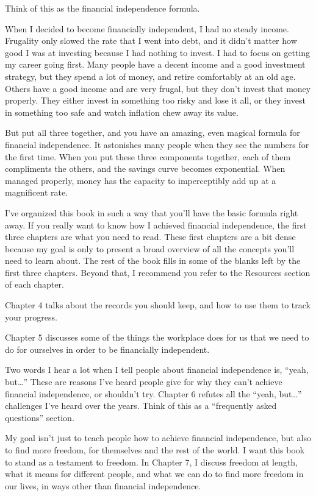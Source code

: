 Think of this as the financial independence formula.

When I decided to become financially independent, I had no steady income. Frugality only slowed the rate that I went into debt, and it didn't matter how good I was at investing because I had nothing to invest. I had to focus on getting my career going first. Many people have a decent income and a good investment strategy, but they spend a lot of money, and retire comfortably at an old age. Others have a good income and are very frugal, but they don't invest that money properly. They either invest in something too risky and lose it all, or they invest in something too safe and watch inflation chew away its value.

But put all three together, and you have an amazing, even magical formula for financial independence. It astonishes many people when they see the numbers for the first time. When you put these three components together, each of them compliments the others, and the savings curve becomes exponential. When managed properly, money has the capacity to imperceptibly add up at a magnificent rate.

I've organized this book in such a way that you'll have the basic formula right away. If you really want to know how I achieved financial independence, the first three chapters are what you need to read. These first chapters are a bit dense because my goal is only to present a broad overview of all the concepts you'll need to learn about. The rest of the book fills in some of the blanks left by the first three chapters. Beyond that, I recommend you refer to the Resources section of each chapter.

Chapter 4 talks about the records you should keep, and how to use them to track your progress.

Chapter 5 discusses some of the things the workplace does for us that we need to do for ourselves in order to be financially independent.

Two words I hear a lot when I tell people about financial independence is, ``yeah, but\ldots'' These are reasons I've heard people give for why they can't achieve financial independence, or shouldn't try. Chapter 6 refutes all the ``yeah, but\ldots'' challenges I've heard over the years. Think of this as a ``frequently asked questions'' section.

My goal isn't just to teach people how to achieve financial independence, but also to find more freedom, for themselves and the rest of the world. I want this book to stand as a testament to freedom. In Chapter 7, I discuss freedom at length, what it means for different people, and what we can do to find more freedom in our lives, in ways other than financial independence.

